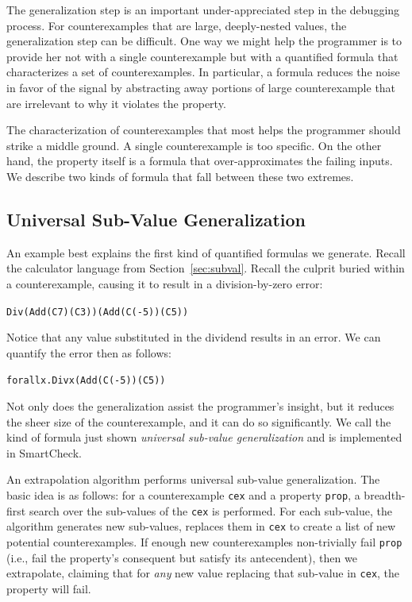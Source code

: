\documentclass[10pt]{sigplanconf}
\newenvironment{code}{\begin{alltt}\small}{\end{alltt}}
\newcommand{\ttp}[1]{\texttt{#1}}
\begin{document}
The generalization step is an important under-appreciated step in the debugging
process.  For counterexamples that are large, deeply-nested values, the
generalization step can be difficult.  One way we might help the programmer is
to provide her not with a single counterexample but with a quantified formula
that characterizes a set of counterexamples.  In particular, a formula reduces
the noise in favor of the signal by abstracting away portions of large
counterexample that are irrelevant to why it violates the property.

The characterization of counterexamples that most helps the programmer should
strike a middle ground.  A single counterexample is too specific.  On the other
hand, the property itself is a formula that over-approximates the failing
inputs.  We describe two kinds of formula that fall between these two extremes.

\subsection{Universal Sub-Value Generalization}\label{sec:universal}
An example best explains the first kind of quantified formulas we generate.
Recall the calculator language from Section~\ref{sec:subval}.  Recall the
culprit buried within a counterexample, causing it to result in a
division-by-zero error:
%
\begin{code}
Div (Add (C 7) (C 3)) (Add (C (-5)) (C 5))
\end{code}
%
\noindent
Notice that any value substituted in the dividend results in an error.  We can
quantify the error then as follows:
%
\begin{code}
forall x . Div x (Add (C (-5)) (C 5))
\end{code}
%
\noindent
Not only does the generalization assist the programmer's insight, but it reduces
the sheer size of the counterexample, and it can do so significantly.  We call
the kind of formula just shown \emph{universal sub-value generalization} and is
implemented in SmartCheck.

An extrapolation algorithm performs universal sub-value generalization.  The
basic idea is as follows: for a counterexample \ttp{cex} and a property
\ttp{prop}, a breadth-first search over the sub-values of the \ttp{cex} is
performed.  For each sub-value, the algorithm generates new sub-values, replaces
them in \ttp{cex} to create a list of new potential counterexamples.  If enough
new counterexamples non-trivially fail \ttp{prop} (i.e., fail the property's
consequent but satisfy its antecendent), then we extrapolate, claiming that for
\emph{any} new value replacing that sub-value in \ttp{cex}, the property will
fail.
\end{document}
